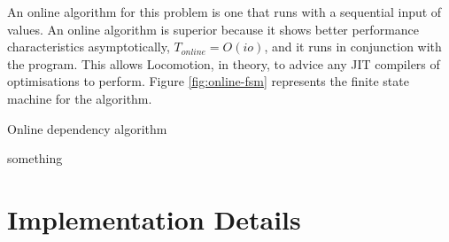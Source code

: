 	An online algorithm for this problem is one that runs with a sequential input of values. An online algorithm is superior because it shows better performance characteristics asymptotically, $T_{online} = O(io)$, and it runs in conjunction with the program. This allows Locomotion, in theory, to advice any JIT compilers of optimisations to perform. Figure \ref{fig:online-fsm} represents the finite state machine for the algorithm.
	
	\begin{algorithm}
		\caption{Online dependency algorithm}
		\label{alg:online-dependency}
		\begin{algorithmic}
			\STATE something
		\end{algorithmic}
	\end{algorithm}

\section{Implementation Details} \label{sec:runtime/implementation}
\